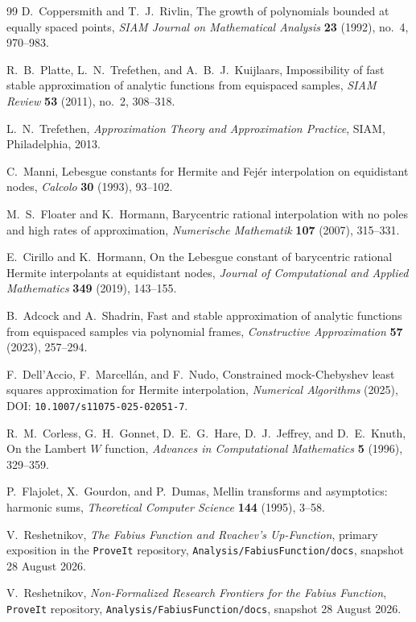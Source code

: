 \documentclass[11pt,oneside]{article}
\numberwithin{equation}{section}
\theoremstyle{definition}
\theoremstyle{remark}
\newcommand{\repo}{\nolinkurl{Analysis/FabiusFunction/docs}}
\begin{document}
\begin{thebibliography}{99}
D.~Coppersmith and T.~J.~Rivlin,
\newblock The growth of polynomials bounded at equally spaced
points,
\newblock \emph{SIAM Journal on Mathematical Analysis} \textbf{23}
(1992), no.~4, 970--983.

R.~B.~Platte, L.~N.~Trefethen, and A.~B.~J.~Kuijlaars,
\newblock Impossibility of fast stable approximation of analytic
functions from equispaced samples,
\newblock \emph{SIAM Review} \textbf{53} (2011), no.~2, 308--318.

L.~N.~Trefethen,
\newblock \emph{Approximation Theory and Approximation Practice},
\newblock SIAM, Philadelphia, 2013.

C.~Manni,
\newblock Lebesgue constants for Hermite and Fej\'er interpolation on
equidistant nodes,
\newblock \emph{Calcolo} \textbf{30} (1993), 93--102.

M.~S.~Floater and K.~Hormann,
\newblock Barycentric rational interpolation with no poles and high
rates of approximation,
\newblock \emph{Numerische Mathematik} \textbf{107} (2007),
315--331.

E.~Cirillo and K.~Hormann,
\newblock On the Lebesgue constant of barycentric rational Hermite
interpolants at equidistant nodes,
\newblock \emph{Journal of Computational and Applied Mathematics}
\textbf{349} (2019), 143--155.

B.~Adcock and A.~Shadrin,
\newblock Fast and stable approximation of analytic functions from
equispaced samples via polynomial frames,
\newblock \emph{Constructive Approximation} \textbf{57} (2023),
257--294.

F.~Dell'Accio, F.~Marcell\'an, and F.~Nudo,
\newblock Constrained mock-Chebyshev least squares approximation for
Hermite interpolation,
\newblock \emph{Numerical Algorithms} (2025),
DOI: \nolinkurl{10.1007/s11075-025-02051-7}.

R.~M.~Corless, G.~H.~Gonnet, D.~E.~G.~Hare, D.~J.~Jeffrey, and
D.~E.~Knuth,
\newblock On the Lambert $W$ function,
\newblock \emph{Advances in Computational Mathematics} \textbf{5}
(1996), 329--359.

P.~Flajolet, X.~Gourdon, and P.~Dumas,
\newblock Mellin transforms and asymptotics: harmonic sums,
\newblock \emph{Theoretical Computer Science} \textbf{144} (1995),
3--58.

V.~Reshetnikov,
\newblock \emph{The Fabius Function and Rvachev's Up-Function},
\newblock primary exposition in the \texttt{ProveIt} repository,
\repo, snapshot 28 August 2026.

V.~Reshetnikov,
\newblock \emph{Non-Formalized Research Frontiers for the Fabius
Function},
\newblock \texttt{ProveIt} repository, \repo, snapshot 28 August
2026.

\end{thebibliography}
\end{document}
